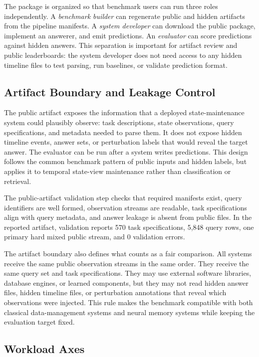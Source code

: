 \documentclass[conference]{IEEEtran}
\begin{document}
The package is organized so that benchmark users can run three roles independently. A \emph{benchmark builder} can regenerate public and hidden artifacts from the pipeline manifests. A \emph{system developer} can download the public package, implement an answerer, and emit predictions. An \emph{evaluator} can score predictions against hidden answers. This separation is important for artifact review and public leaderboards: the system developer does not need access to any hidden timeline files to test parsing, run baselines, or validate prediction format.

\subsection{Artifact Boundary and Leakage Control}

The public artifact exposes the information that a deployed state-maintenance system could plausibly observe: task descriptions, state observations, query specifications, and metadata needed to parse them. It does not expose hidden timeline events, answer sets, or perturbation labels that would reveal the target answer. The evaluator can be run after a system writes predictions. This design follows the common benchmark pattern of public inputs and hidden labels, but applies it to temporal state-view maintenance rather than classification or retrieval.

The public-artifact validation step checks that required manifests exist, query identifiers are well formed, observation streams are readable, task specifications align with query metadata, and answer leakage is absent from public files. In the reported artifact, validation reports 570 task specifications, 5,848 query rows, one primary hard mixed public stream, and 0 validation errors.

The artifact boundary also defines what counts as a fair comparison. All systems receive the same public observation streams in the same order. They receive the same query set and task specifications. They may use external software libraries, database engines, or learned components, but they may not read hidden answer files, hidden timeline files, or perturbation annotations that reveal which observations were injected. This rule makes the benchmark compatible with both classical data-management systems and neural memory systems while keeping the evaluation target fixed.

\subsection{Workload Axes}
\end{document}
